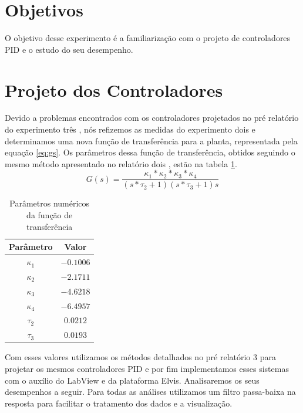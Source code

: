 \documentclass{article}
\begin{document}


\onehalfspacing
\section{Objetivos} 
O objetivo desse experimento é a familiarização com o projeto de controladores PID e o estudo do seu desempenho.
	
\section{Projeto dos Controladores}
Devido a problemas encontrados com os controladores projetados no pré relatório do experimento três \cite{bb:prelab3}, nós refizemos as medidas do experimento dois e determinamos uma nova função de transferência para a planta, representada pela equação \ref{eq:gs}. Os parâmetros dessa função de transferência, obtidos seguindo o mesmo método apresentado no relatório dois \cite{bb:lab2}, estão na tabela \ref{tab:valores}.
\begin{equation}
\label{eq:gs}
G(s) = \frac{\kappa_1*\kappa_2*\kappa_3*\kappa_4}{(s*\tau_2 + 1)(s*\tau_3 + 1)s}
\end{equation}

\begin{table}[H]
	\centering
	\caption{Parâmetros numéricos da função de transferência}
	\label{tab:valores}
	\begin{tabular}{|c|c|}
		\hline Parâmetro & Valor \\ 
		\hline $\kappa_1$ & $-0.1006$\\ 
		\hline $\kappa_2$ & $-2.1711$\\ 
		\hline $\kappa_3$ & $-4.6218$\\ 
		\hline $\kappa_4$ & $-6.4957$\\ 
		\hline $\tau_2$ & $0.0212$\\ 
		\hline $\tau_3$ & $0.0193$ \\ 	
		\hline 
	\end{tabular} 
\end{table}

Com esses valores utilizamos os métodos detalhados no pré relatório 3 \cite{bb:prelab3} para projetar os mesmos controladores PID e por fim implementamos esses sistemas com o auxílio do LabView e da plataforma Elvis. Analisaremos os seus desempenhos a seguir. Para todas as análises utilizamos um filtro passa-baixa na resposta para facilitar o tratamento dos dados e a visualização.
\end{document}
